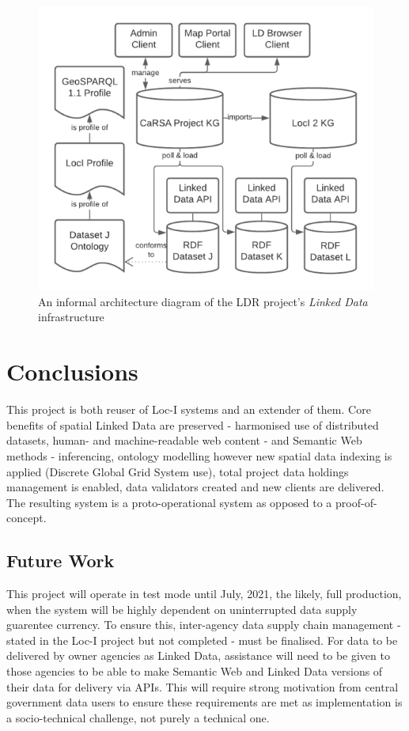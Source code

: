 \documentclass[runningheads]{llncs}
\begin{document}
\begin{figure}[htb]
    \centering
    \includegraphics[width=0.5\linewidth]{images/l4dr-arch.png}
    \caption{An informal architecture diagram of the LDR project's \textit{Linked Data} infrastructure}
    \label{fig:l4dr-arch}
\end{figure}


\section{Conclusions}\label{sec:conclusions}
This project is both reuser of Loc-I systems and an extender of them. Core benefits of spatial Linked Data are preserved - harmonised use of distributed datasets, human- and machine-readable 
web content - and Semantic Web methods - inferencing, ontology modelling however new spatial data indexing is applied (Discrete Global Grid System use), total project data holdings management is
enabled, data validators created and new clients are delivered. The resulting system is a proto-operational system as opposed to a proof-of-concept.


\subsection{Future Work}\label{sec:futurework}
This project will operate in test mode until July, 2021, the likely, full production, when the system will be highly dependent on 
uninterrupted data supply guarentee currency. To ensure this, inter-agency data supply chain management - stated in the Loc-I project but not completed - 
must be finalised. For data to be delivered by owner agencies as Linked Data, assistance will need to be given to those agencies to be able to make Semantic Web and Linked Data versions of their data
for delivery via APIs. This will require strong motivation from central government data users to ensure these requirements are met as implementation is a socio-technical challenge, not purely a 
technical one.
\end{document}
